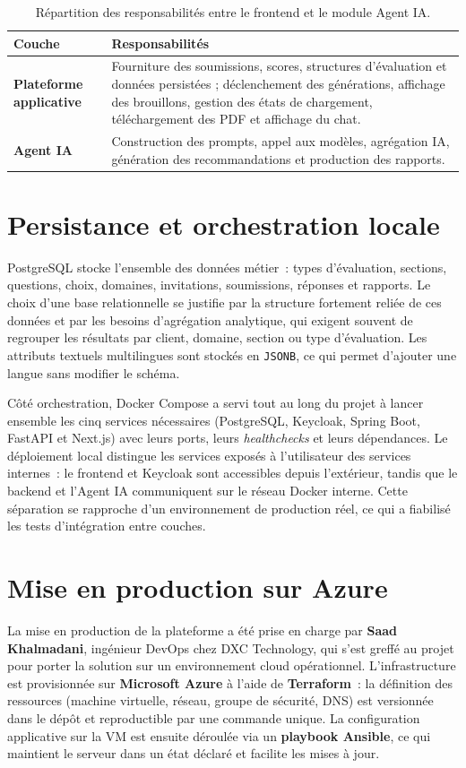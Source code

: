 \documentclass[12pt,a4paper]{report}
\begin{document}
\begin{table}[H]
\centering
\caption{Répartition des responsabilités entre le frontend et le module Agent IA.}
\begin{tabularx}{\textwidth}{>{\bfseries}L{4cm}Y}
\toprule
Couche & Responsabilités \\
\midrule
Plateforme applicative & Fourniture des soumissions, scores, structures d'évaluation et données persistées ; déclenchement des générations, affichage des brouillons, gestion des états de chargement, téléchargement des PDF et affichage du chat. \\
Agent IA & Construction des prompts, appel aux modèles, agrégation IA, génération des recommandations et production des rapports. \\
\bottomrule
\end{tabularx}
\end{table}

\section{Persistance et orchestration locale}
PostgreSQL stocke l'ensemble des données métier~: types d'évaluation, sections, questions, choix, domaines, invitations, soumissions, réponses et rapports. Le choix d'une base relationnelle se justifie par la structure fortement reliée de ces données et par les besoins d'agrégation analytique, qui exigent souvent de regrouper les résultats par client, domaine, section ou type d'évaluation. Les attributs textuels multilingues sont stockés en \texttt{JSONB}, ce qui permet d'ajouter une langue sans modifier le schéma.

Côté orchestration, Docker Compose a servi tout au long du projet à lancer ensemble les cinq services nécessaires (PostgreSQL, Keycloak, Spring Boot, FastAPI et Next.js) avec leurs ports, leurs \textit{healthchecks} et leurs dépendances. Le déploiement local distingue les services exposés à l'utilisateur des services internes~: le frontend et Keycloak sont accessibles depuis l'extérieur, tandis que le backend et l'Agent IA communiquent sur le réseau Docker interne. Cette séparation se rapproche d'un environnement de production réel, ce qui a fiabilisé les tests d'intégration entre couches.

\section{Mise en production sur Azure}
La mise en production de la plateforme a été prise en charge par \textbf{Saad Khalmadani}, ingénieur DevOps chez DXC Technology, qui s'est greffé au projet pour porter la solution sur un environnement cloud opérationnel. L'infrastructure est provisionnée sur \textbf{Microsoft Azure} à l'aide de \textbf{Terraform}~: la définition des ressources (machine virtuelle, réseau, groupe de sécurité, DNS) est versionnée dans le dépôt et reproductible par une commande unique. La configuration applicative sur la VM est ensuite déroulée via un \textbf{playbook Ansible}, ce qui maintient le serveur dans un état déclaré et facilite les mises à jour.
\end{document}
